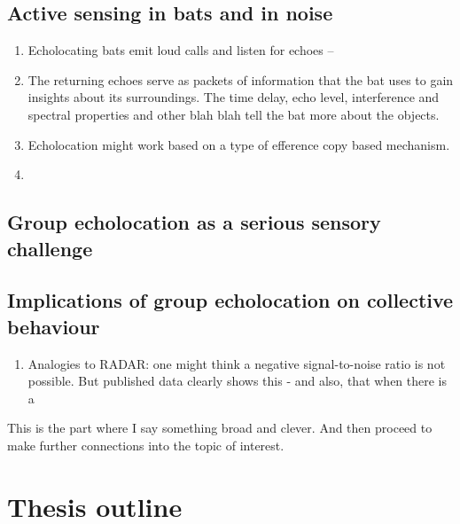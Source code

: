 \documentclass[
]{book}
\providecommand{\tightlist}{%
  \setlength{\itemsep}{0pt}\setlength{\parskip}{0pt}}
\begin{document}
\hypertarget{active-sensing-in-bats-and-in-noise}{%
\subsection{Active sensing in bats and in noise}\label{active-sensing-in-bats-and-in-noise}}

\begin{enumerate}
\def\labelenumi{\arabic{enumi}.}
\item
  Echolocating bats emit loud calls and listen for echoes --
\item
  The returning echoes serve as packets of information that the bat uses to gain insights about its surroundings. The time delay, echo level, interference and spectral properties and other blah blah tell the bat more about the objects.
\item
  Echolocation might work based on a type of efference copy based mechanism.
\item
\end{enumerate}

\hypertarget{group-echolocation-as-a-serious-sensory-challenge}{%
\subsection{Group echolocation as a serious sensory challenge}\label{group-echolocation-as-a-serious-sensory-challenge}}

\hypertarget{implications-of-group-echolocation-on-collective-behaviour}{%
\subsection{Implications of group echolocation on collective behaviour}\label{implications-of-group-echolocation-on-collective-behaviour}}

\begin{enumerate}
\def\labelenumi{\arabic{enumi}.}
\tightlist
\item
  Analogies to RADAR: one might think a negative signal-to-noise ratio is not possible. But published data clearly shows this - and also, that when there is a
\end{enumerate}

This is the part where I say something broad and clever. And then proceed to make further connections into the topic of interest.

\hypertarget{thesis-outline}{%
\section{Thesis outline}\label{thesis-outline}}
\end{document}
